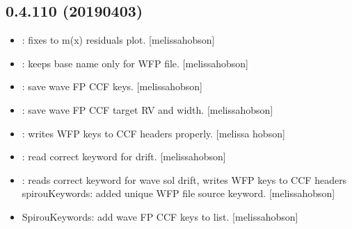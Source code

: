 \documentclass[a4paper,10pt,english]{report}
\begin{document}
\subsection{0.4.110 (2019\sphinxhyphen{}04\sphinxhyphen{}03)}
\label{\detokenize{misc/changelog:id172}}\begin{itemize}
\item {} 
: fixes to m(x) residuals plot. {[}melissa\sphinxhyphen{}hobson{]}

\item {} 
: keeps base name only for WFP file. {[}melissa\sphinxhyphen{}hobson{]}

\item {} 
: save wave FP CCF keys. {[}melissa\sphinxhyphen{}hobson{]}

\item {} 
: save wave FP CCF target RV and width. {[}melissa\sphinxhyphen{}hobson{]}

\item {} 
: writes WFP keys to CCF headers properly. {[}melissa\sphinxhyphen{}
hobson{]}

\item {} 
: read correct keyword for drift. {[}melissa\sphinxhyphen{}hobson{]}

\item {} 
: reads correct keyword for wave sol drift, writes WFP
keys to CCF headers spirouKeywords: added unique WFP file source
keyword. {[}melissa\sphinxhyphen{}hobson{]}

\item {} 
SpirouKeywords: add wave FP CCF keys to list. {[}melissa\sphinxhyphen{}hobson{]}

\end{itemize}
\end{document}
